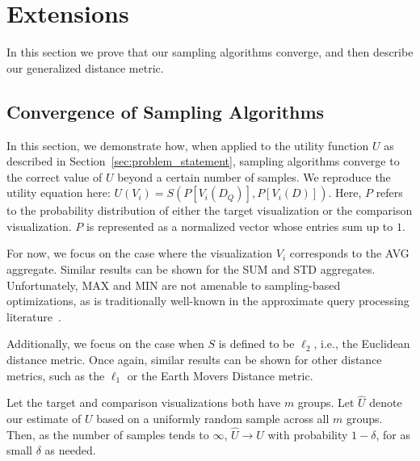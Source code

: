 
\section{Extensions}
In this section we prove that our sampling 
algorithms converge, and then describe our generalized
distance metric.
\subsection{Convergence of Sampling Algorithms}
In this section, we demonstrate how,
when applied to the utility function $U$ as described
in Section~\ref{sec:problem_statement},
sampling algorithms 
converge to the correct value of $U$ beyond a certain number of samples.
We reproduce the utility equation here:
$ U (V_i) = S ( P[V_i (D_Q)], P[V_i (D)] )$.
Here, $P$ refers to the probability distribution
of either the target visualization
or the comparison visualization.
$P$ is represented as a normalized vector
whose entries sum up to $1$.

For now, we focus on the case where the visualization $V_i$
corresponds to the AVG aggregate. 
Similar results can be shown for the SUM and STD
aggregates. 
Unfortunately, MAX and MIN are not amenable to sampling-based
optimizations, as is traditionally well-known in the approximate
query processing literature~\cite{wavelets,dbo}.

Additionally, we focus on the case when $S$ is defined to be
$\ell_2$, i.e., the Euclidean distance metric. 
Once again, similar results can be shown for other distance metrics,
such as the $\ell_1$ or the Earth Movers Distance metric.



\begin{lemma}
Let the target and comparison visualizations
both have $m$ groups.
Let $\hat{U}$ denote our estimate of $U$ based on a uniformly random sample 
across all $m$ groups. 
Then, as the number of samples tends to $\infty$, $\hat{U} \rightarrow U$
with probability $1-\delta$, for as small $\delta$ as needed.
\end{lemma}


